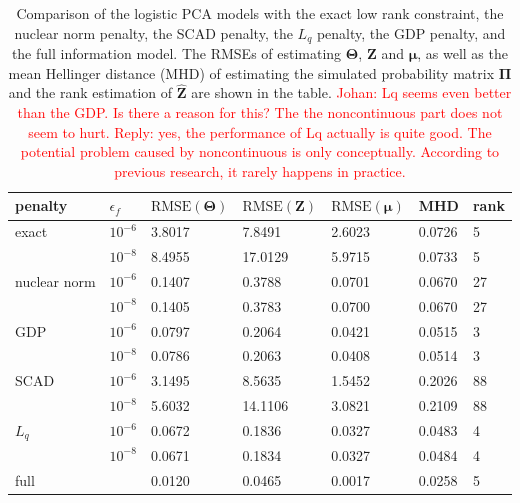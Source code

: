 \begin{table}[htbp]
\centering
\caption{Comparison of the logistic PCA models with the exact low rank constraint, the nuclear norm penalty, the SCAD penalty, the $L_{q}$ penalty, the GDP penalty, and the full information model. The RMSEs of estimating $\mathbf{\Theta}$, $\mathbf{Z}$ and $\bm{\mu}$, as well as the mean Hellinger distance (MHD) of estimating the simulated probability matrix $\mathbf{\Pi}$ and the rank estimation of $\hat{\mathbf{Z}}$ are shown in the table. \textcolor{red}{Johan: Lq seems even better than the GDP. Is there a reason for this?
The the noncontinuous part does not seem to hurt. Reply: yes, the performance of Lq actually is quite good. The potential problem caused by noncontinuous is only conceptually. According to previous research, it rarely happens in practice.} }
\label{chapter3_tab:2}
\begin{tabular}{lllllll}
  \toprule
penalty & $\epsilon_f$ & $\text{RMSE}(\mathbf{\Theta})$ & $\text{RMSE}(\mathbf{Z})$ & $\text{RMSE}(\bm{\mu})$ & MHD & rank \\
  \midrule
  \multirow{2}{0.5em}{exact} & $10^{-6}$  &3.8017    &7.8491    &2.6023    &0.0726    &5      \\
                             & $10^{-8}$  &8.4955    &17.0129   &5.9715    &0.0733    &5      \\
  \hline
  \multirow{2}{0.5em}{nuclear norm} & $10^{-6}$  &0.1407    &0.3788    &0.0701    &0.0670   &27      \\
                                    & $10^{-8}$  &0.1405    &0.3783    &0.0700    &0.0670   &27     \\
  \hline
  \multirow{2}{0.5em}{GDP} & $10^{-6}$   &0.0797    &0.2064    &0.0421    &0.0515    &3    \\
                           & $10^{-8}$   &0.0786    &0.2063    &0.0408    &0.0514    &3    \\
  \hline
  \multirow{2}{0.5em}{SCAD} & $10^{-6}$  &3.1495    &8.5635    &1.5452    &0.2026   &88      \\
                            & $10^{-8}$  &5.6032    &14.1106    &3.0821    &0.2109   &88    \\
  \hline
  \multirow{2}{0.5em}{$L_{q}$} & $10^{-6}$   &0.0672    &0.1836    &0.0327    &0.0483  &4    \\
                           & $10^{-8}$   &0.0671    &0.1834    &0.0327    &0.0484    &4    \\
  \hline
  full &   &0.0120    &0.0465    &0.0017    &0.0258    &5     \\

  \bottomrule
\end{tabular}
\end{table}

